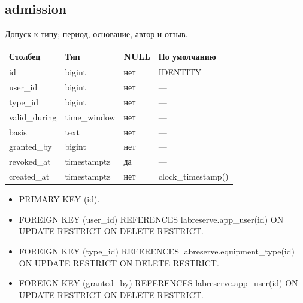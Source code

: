 \par\noindent\begin{minipage}{\linewidth}
\subsection{admission}
Допуск к типу; период, основание, автор и отзыв.\par\smallskip\noindent
\begin{tabular}{p{}p{}p{}p{}}
\toprule Столбец & Тип & NULL & По умолчанию \\ \midrule
id & bigint & нет & IDENTITY \\
user\_\allowbreak{}id & bigint & нет & — \\
type\_\allowbreak{}id & bigint & нет & — \\
valid\_\allowbreak{}during & time\_\allowbreak{}window & нет & — \\
basis & text & нет & — \\
granted\_\allowbreak{}by & bigint & нет & — \\
revoked\_\allowbreak{}at & timestamptz & да & — \\
created\_\allowbreak{}at & timestamptz & нет & clock\_\allowbreak{}timestamp() \\
\bottomrule\end{tabular}\end{minipage}\par
\begin{itemize}
\item PRIMARY KEY (id).
\item FOREIGN KEY (user\_\allowbreak{}id) REFERENCES labreserve.app\_\allowbreak{}user(id) ON UPDATE RESTRICT ON DELETE RESTRICT.
\item FOREIGN KEY (type\_\allowbreak{}id) REFERENCES labreserve.equipment\_\allowbreak{}type(id) ON UPDATE RESTRICT ON DELETE RESTRICT.
\item FOREIGN KEY (granted\_\allowbreak{}by) REFERENCES labreserve.app\_\allowbreak{}user(id) ON UPDATE RESTRICT ON DELETE RESTRICT.
\end{itemize}
